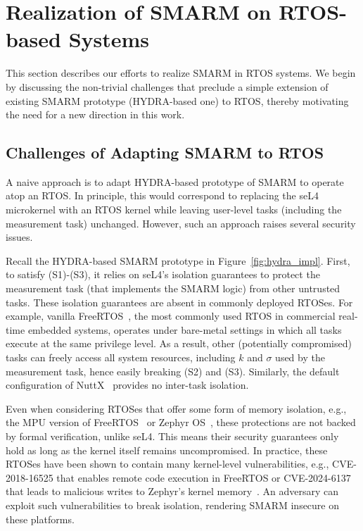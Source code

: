 \documentclass[journal]{IEEEtran}
\begin{document}
\section{Realization of SMARM on RTOS-based Systems}
\label{sec:porting}

This section describes our efforts to realize SMARM in RTOS systems.
We begin by discussing the non-trivial challenges that preclude a simple extension of existing SMARM prototype (HYDRA-based one) to RTOS, thereby motivating the need for a new direction in this work.




\subsection{Challenges of Adapting SMARM to RTOS}\label{subsec:naive}

A naive approach is to adapt HYDRA-based prototype of SMARM to operate atop an RTOS.
In principle, this would correspond to replacing the seL4 microkernel with an RTOS kernel while leaving user-level tasks (including the measurement task) unchanged.
However, such an approach raises several security issues.


Recall the HYDRA-based SMARM prototype in Figure~\ref{fig:hydra_impl}.
First, to satisfy (S1)-(S3), it relies on seL4's isolation guarantees to protect the measurement task (that implements the SMARM logic) from other untrusted tasks.
These isolation guarantees are absent in commonly deployed RTOSes.
For example, vanilla FreeRTOS~\cite{freertos}, the most commonly used RTOS in commercial real-time embedded systems, operates under bare-metal settings in which all tasks execute at the same privilege level.
As a result, other (potentially compromised) tasks can freely access all system resources, including $k$ and $\sigma$ used by the measurement task, hence easily breaking (S2) and (S3).
Similarly, the default configuration of NuttX~\cite{nuttx} provides no inter-task isolation.

Even when considering RTOSes that offer some form of memory isolation, e.g., the MPU version of FreeRTOS~\cite{freertos-mpu} or Zephyr OS~\cite{zephyr}, these protections are not backed by formal verification, unlike seL4.
This means their security guarantees only hold as long as the kernel itself remains uncompromised.
In practice, these RTOSes have been shown to contain many kernel-level vulnerabilities, e.g., CVE-2018-16525 that enables remote code execution in FreeRTOS or CVE-2024-6137 that leads to malicious writes to Zephyr's kernel memory~\cite{cve_freertos_rce,cve_zephyr_memory}.
An adversary can exploit such vulnerabilities to break isolation, rendering SMARM insecure on these platforms.
\end{document}
